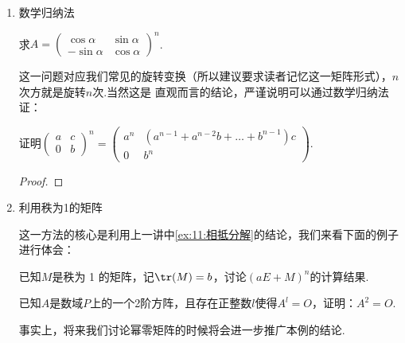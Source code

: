 \begin{enumerate}
    \begin{solution}

    \end{solution}

    \item 数学归纳法
    \begin{example}
        求$A=\begin{pmatrix}\cos\alpha & \sin\alpha \\ -\sin\alpha & \cos\alpha\end{pmatrix}^n$.
    \end{example}
    这一问题对应我们常见的旋转变换（所以建议要求读者记忆这一矩阵形式），$n$次方就是旋转$n$次.当然这是
    直观而言的结论，严谨说明可以通过数学归纳法证：
    
    \begin{solution}

    \end{solution}

    \begin{example}
        证明$\begin{pmatrix}
            a & c \\ 0 & b
        \end{pmatrix}^n=\begin{pmatrix}
            a^n & (a^{n-1}+a^{n-2}b+\dots+b^{n-1})c \\ 0 & b^n
        \end{pmatrix}$.
    \end{example}
    \begin{proof}
        
    \end{proof}

    \item 利用秩为1的矩阵

    这一方法的核心是利用上一讲中\autoref{ex:11:相抵分解}的结论，我们来看下面的例子进行体会：
    \begin{example}
        已知$M$是秩为 1 的矩阵，记$\tr(M)=b$，讨论$(aE+M)^n$的计算结果.
    \end{example}
    \begin{solution}

    \end{solution}

    \begin{example}
        已知$A$是数域$P$上的一个2阶方阵，且存在正整数$l$使得$A^l=O$，证明：$A^2=O$.
    \end{example}
    事实上，将来我们讨论幂零矩阵的时候将会进一步推广本例的结论.


\end{enumerate}
